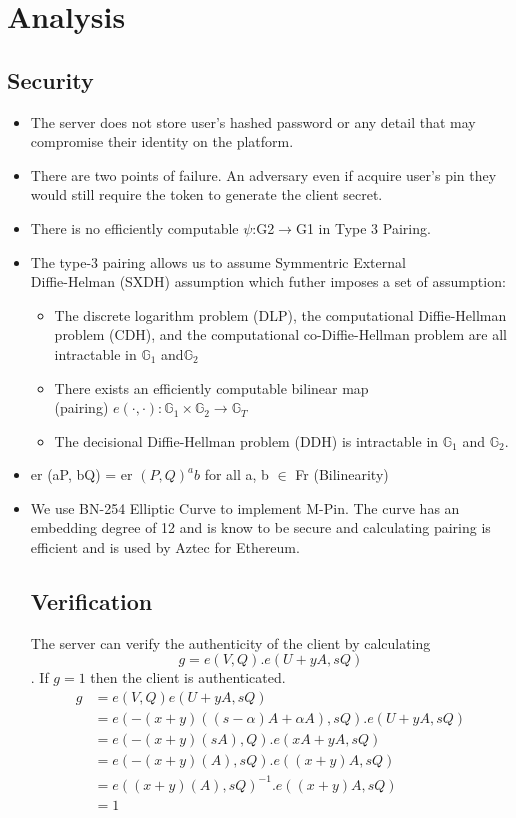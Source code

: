 \documentclass[]{article}   %
\begin{document}
\section*{Analysis}
\subsection*{Security}
\begin{itemize}
    \item The server does not store user's hashed password or any detail that may compromise their identity on the platform. 
    \item There are two points of failure. An adversary even if acquire user's pin they would still require the token to generate the client secret. 
    \item There is no efficiently computable $\psi$:G2$\rightarrow$G1 in Type 3 Pairing. \cite{Steven:2013}
    \item The type-3 pairing allows us to assume Symmentric External \\ Diffie-Helman (SXDH) assumption which futher imposes a set of assumption:
    \begin{itemize}
        \item The discrete logarithm problem (DLP), the computational Diffie-Hellman problem (CDH), and the computational co-Diffie-Hellman problem are all intractable in ${\displaystyle {\mathbb {G} }_{1}}$ and$ {\displaystyle {\mathbb {G} }_{2}} $
        \item There exists an efficiently computable bilinear map  \\(pairing) ${\displaystyle e(\cdot ,\cdot ):{\mathbb {G} }_{1}\times {\mathbb {G} }_{2}\rightarrow {\mathbb {G} }_{T}} $
        \item The decisional Diffie-Hellman problem (DDH) is intractable in
        ${\displaystyle {\mathbb {G} }_{1}}$ and ${\mathbb {G} }_{2}.$
    \end{itemize}

    \item er (aP, bQ) = er $(P, Q)^ab$ for all a, b $\in$ Fr (Bilinearity)
    \item We use BN-254 Elliptic Curve to implement M-Pin. The curve has an embedding degree of 12 and is know to be secure and calculating pairing is efficient and is used by Aztec for Ethereum. \cite{Aztec:2013}

\subsection*{Verification}
The server can verify the authenticity of the client by calculating $$g=e(V, Q).e(U + yA, sQ)$$. If $g=1$ then the client is authenticated.
\begin{align*}
    g &= e(V, Q)e(U + yA, sQ) \\
    &= e(-(x+y)((s-\alpha)A +\alpha A), sQ).e(U + yA, sQ) \\
    &= e(-(x+y)(sA), Q).e(xA + yA, sQ) \\
    &= e(-(x+y)(A), sQ).e((x + y)A, sQ) \\
    &= e((x+y)(A), sQ)^{-1}.e((x+y)A, sQ) \\
    &= 1
\end{align*}



\end{itemize}
\end{document}
